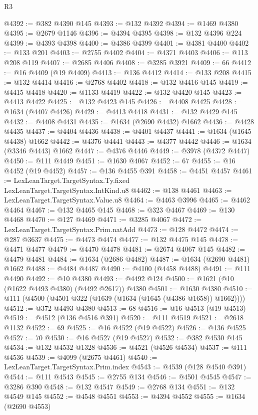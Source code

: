 \begin{lexlean}{R3}
\begin{coremodule}
@4392 := @382 @4390 @145
@4393 := @132 @4392
@4394 := @1469 @4380
@4395 := @2679 @1146
@4396 := @4394 @4395
@4398 := @132 @4396 @224
@4399 := @4393 @4398
@4400 := @4386 @4399
@4401 := @4381 @4400
@4402 := @133 @201
@4403 := @2755 @4402
@4404 := @4371 @4403
@4406 := @113 @208 @119
@4407 := @2685 @4406
@4408 := @3285 @3921
@4409 := 66
@4412 := @16 @4409 (@19 @4409)
@4413 := @136 @4412
@4414 := @133 @208
@4415 := @132 @4414
@4416 := @2768 @4402
@4418 := @132 @4416 @145
@4419 := @4415 @4418
@4420 := @1133 @4419
@4422 := @132 @4420 @145
@4423 := @4413 @4422
@4425 := @132 @4423 @145
@4426 := @4408 @4425
@4428 := @1634 (@4407 @4426)
@4429 := @4413 @4418
@4431 := @132 @4429 @145
@4432 := @4408 @4431
@4435 := @1634 (@2690 @4432) @1662
@4436 := @4428 @4435
@4437 := @4404 @4436
@4438 := @4401 @4437
@4441 := @1634 (@1645 @4438) @1662
@4442 := @4376 @4441
@4443 := @4377 @4442
@4446 := @1634 (@3346 @4443) @1662
@4447 := @4376 @4446
@4449 := @3978 (@4372 @4447)
@4450 := @111 @4449
@4451 := @1630 @4067
@4452 := 67
@4455 := @16 @4452 (@19 @4452)
@4457 := @136 @4455 @391
@4458 := @4451 @4457
@4461 := LexLeanTarget.TargetSyntax.Ty.fixed LexLeanTarget.TargetSyntax.IntKind.u8
@4462 := @138 @4461
@4463 := LexLeanTarget.TargetSyntax.Value.u8
@4464 := @4463 @3996
@4465 := @4462 @4464
@4467 := @132 @4465 @145
@4468 := @323 @4467
@4469 := @130 @4468
@4470 := @127 @4469
@4471 := @3285 @4067
@4472 := LexLeanTarget.TargetSyntax.Prim.natAdd
@4473 := @128 @4472
@4474 := @287 @3637
@4475 := @4473 @4474
@4477 := @132 @4475 @145
@4478 := @4471 @4477
@4479 := @4470 @4478
@4481 := @2674 @4067 @145
@4482 := @4479 @4481
@4484 := @1634 (@2686 @4482)
@4487 := @1634 (@2690 @4481) @1662
@4488 := @4484 @4487
@4490 := @4100 (@4458 @4488)
@4491 := @111 @4490
@4492 := @10 @4380
@4493 := @4492 @124
@4500 := @1621 (@10 (@1622 @4493 @4380) (@4492 @2617)) @4380
@4501 := @1630 @4380
@4510 := @111 (@4500 (@4501 @322 (@1639 (@1634 (@1645 (@4386 @1658)) @1662))))
@4512 := @372 @4493 @4380
@4513 := 68
@4516 := @16 @4513 (@19 @4513)
@4519 := @4512 (@136 @4516 @391)
@4520 := @111 @4519
@4521 := @2618 @1132
@4522 := 69
@4525 := @16 @4522 (@19 @4522)
@4526 := @136 @4525
@4527 := 70
@4530 := @16 @4527 (@19 @4527)
@4532 := @382 @4530 @145
@4534 := @132 @4532 @1328
@4536 := @4521 (@4526 @4534)
@4537 := @111 @4536
@4539 := @4099 (@2675 @4461)
@4540 := LexLeanTarget.TargetSyntax.Prim.index
@4543 := @4539 (@128 @4540 @391)
@4544 := @111 @4543
@4545 := @2755 @134
@4546 := @4501 @4545
@4547 := @3286 @390
@4548 := @132 @4547
@4549 := @2768 @134
@4551 := @132 @4549 @145
@4552 := @4548 @4551
@4553 := @4394 @4552
@4555 := @1634 (@2690 @4553)

\end{coremodule}
\end{lexlean}
